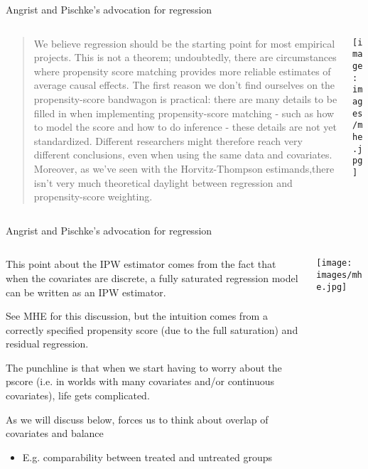 \documentclass[notes,11pt, aspectratio=169]{beamer}
\newenvironment{wideitemize}{\itemize\addtolength{\itemsep}{10pt}}{\enditemize}
\begin{document}
\begin{frame}{Angrist and Pischke's advocation for regression}
\begin{columns}[T] %
  \begin{column}{.65\textwidth}
    \begin{quote}
      We believe regression should be the starting point for most empirical projects. This is not a theorem; undoubtedly, there are circumstances where propensity score matching provides more reliable estimates of average causal effects. The first reason we don't find ourselves on the propensity-score bandwagon is practical: there are many details to be filled in when implementing propensity-score matching - such as how to model the score and how to do inference - these details are not yet standardized. Different researchers might therefore reach very different conclusions, even when using the same data and covariates. Moreover, as we've seen with the Horvitz-Thompson estimands,there isn't very much theoretical daylight between regression and propensity-score weighting.
      \end{quote}
\end{column}%
\hfill%
\begin{column}{.35\textwidth}
\texttt{[image: images/mhe.jpg]}
\end{column}%
\end{columns}
\end{frame}


\begin{frame}{Angrist and Pischke's advocation for regression}
\begin{columns}[T] %
  \begin{column}{.65\textwidth}
    \begin{wideitemize}
    \item This point about the IPW estimator comes from the fact that
      when the covariates are discrete, a fully saturated regression
      model can be written as an IPW estimator.
    \item See MHE for this discussion, but the intuition comes from a
      correctly specified propensity score (due to the full
      saturation) and residual regression.
    \item The punchline is that when we start having to worry about
      the pscore (i.e. in worlds with many covariates and/or
      continuous covariates), life gets complicated.
    \item As we will discuss below, forces us to think about overlap of covariates and balance
      \begin{itemize}
      \item E.g. comparability between treated and untreated groups
      \end{itemize}
    \end{wideitemize}
\end{column}%
\hfill%
\begin{column}{.35\textwidth}
\texttt{[image: images/mhe.jpg]}
\end{column}%
\end{columns}
\end{frame}
\end{document}
